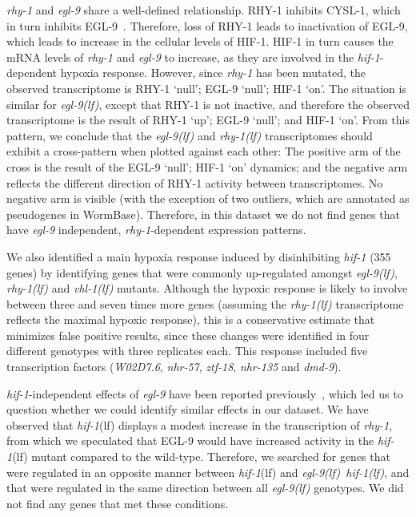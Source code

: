 \documentclass[10pt, onecolumn]{article}
\newcommand{\gene}[1]{\emph{#1}}
\newcommand{\nhr}{\emph{\mbox{nhr-57}}}
\newcommand{\egl}{\emph{\mbox{egl-9}(lf)}}
\newcommand{\rhy}{\emph{\mbox{rhy-1}(lf)}}
\newcommand{\vhl}{\emph{\mbox{vhl-1}(lf)}}
\newcommand{\eglhif}{\emph{\mbox{egl-9(lf)}~\mbox{hif-1(lf)}}}
\newcommand{\hif}{\emph{\mbox{hif-1}}(lf)}
\newcommand{\eglp}{EGL-9}
\newcommand{\rhyp}{RHY-1}
\newcommand{\hifp}{HIF-1}
\newcommand{\cyslp}{CYSL-1}
\begin{document}
\gene{rhy-1} and \gene{egl-9} share a well-defined relationship. \rhyp{}
inhibits \cyslp{},
which in turn inhibits \eglp{}~\cite{Ma2012}. Therefore, loss of \rhyp{} leads
to inactivation of \eglp{}, which leads to increase in the cellular levels of
\hifp{}. \hifp{} in turn causes the mRNA levels of \gene{rhy-1} and \gene{egl-9}
to increase,
as they are involved in the \gene{hif-1}-dependent hypoxia response. However, since
\gene{rhy-1} has been mutated, the observed transcriptome is
\rhyp{} `null'; \eglp{} `null'; \hifp{} `on'. The situation is similar for
\egl{}, except that \rhyp{}
is not inactive, and therefore the observed transcriptome is the result of
\rhyp{} `up'; \eglp{} `null'; and \hifp{} `on'. From this pattern, we conclude that
the \egl{} and \rhy{} transcriptomes should exhibit a cross-pattern when plotted
against each other: The positive
arm of the cross is the result of the \eglp{} `null'; \hifp{} `on' dynamics; and the
negative arm reflects the different direction of \rhyp{} activity between
transcriptomes. No negative arm is visible (with the exception of two
outliers, which are annotated as pseudogenes in WormBase). Therefore, in this
dataset we do not find genes that have \gene{egl-9} independent,
\gene{rhy-1}-dependent expression patterns.

We also identified a main hypoxia response induced by disinhibiting
\gene{hif-1} (355 genes) by identifying genes that were commonly up-regulated
amongst \egl{}, \rhy{} and \vhl{} mutants. Although the hypoxic response is likely
to involve between three and seven times more genes (assuming the \rhy{} transcriptome
reflects the maximal hypoxic response), this is a conservative
estimate that minimizes false positive results, since these changes were
identified in four different genotypes with three replicates each. This response
included five transcription factors (\gene{W02D7.6}, \nhr{}, \gene{ztf-18},
\gene{nhr-135} and \gene{dmd-9}).

\gene{hif-1}-independent effects of \gene{egl-9} have been reported
previously~\cite{Park2012}, which led us to question whether we could identify
similar effects in our dataset. We have observed that \hif{} displays a modest
increase in the transcription of \gene{rhy-1}, from which we speculated that
\eglp{} would have increased activity in the \hif{} mutant compared to the wild-type.
Therefore, we searched for genes that were regulated in an opposite manner between
\hif{} and \eglhif{}, and that were regulated in the same direction between
all \egl{} genotypes. We did not find any genes that met these conditions.
\end{document}
